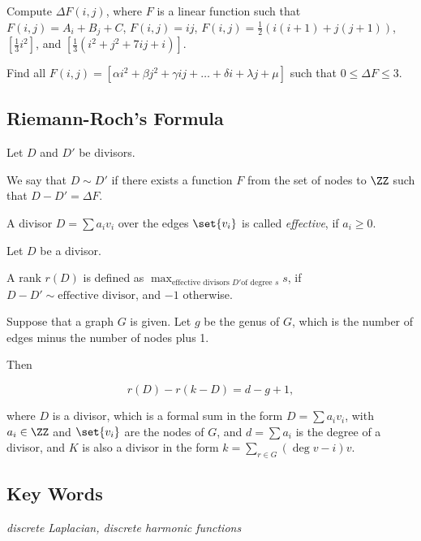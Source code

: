 \documentclass[11pt]{scrartcl}
\begin{document}
  \begin{exercise}

    Compute $\Delta F(i, j)$, where $F$ is a linear function such that
    $F(i, j) = A_{i} + B_{j} + C$, $F(i, j) = ij$,
    $F(i, j) = \frac{1}{2}(i(i+1)+j(j+1))$, $[\frac{1}{3}i^{2}]$, and
    $[\frac{1}{3}(i^{2}+j^{2}+7ij + i)]$.

  \end{exercise}

  \begin{exercise}[Mega]

    Find all
    $F(i, j) = [\alpha i^{2} + \beta j^{2} + \gamma ij + \dots +
    \delta i + \lambda j + \mu]$ such that $0 \leq \Delta F \leq 3$.

  \end{exercise}

  \subsection{Riemann-Roch's Formula}
  \begin{definition}
    Let $D$ and $D'$ be divisors.

    We say that $D \sim D'$ if there exists a function $F$ from the
    set of nodes to $\ZZ$ such that $D-D' = \Delta F$.
  \end{definition}

  \begin{definition}
    A divisor $D = \sum a_{i}v_{i}$ over the edges $\set{v_{i}}$ is
    called \textit{effective}, if $a_{i} \geq 0$.
  \end{definition}

  \begin{definition}
    Let $D$ be a divisor.

    A rank $r(D)$ is defined as $\max_{\text{effective divisors $D'$
        of degree $s$}} s$, if $D-D' \sim \text{effective divisor}$,
    and $- 1$ otherwise.
  \end{definition}

  \begin{theorem}
    Suppose that a graph $G$ is given. Let $g$ be the genus of $G$,
    which is the number of edges minus the number of nodes plus 1.

    Then
    
    \begin{equation*}
      r(D) - r(k-D) = d - g + 1,
    \end{equation*}

    where $D$ is a divisor, which is a formal sum in the form
    $D = \sum a_{i}v_{i}$, with $a_{i} \in \ZZ$ and $\set{v_{i}}$ are
    the nodes of $G$, and $d = \sum a_{i}$ is the degree of a divisor,
    and $K$ is also a divisor in the form
    $k = \sum_{r\in G}(\deg v - i) v$.

  \end{theorem}

  \subsection{Key Words}
  \textit{discrete Laplacian, discrete harmonic functions}
\end{document}
